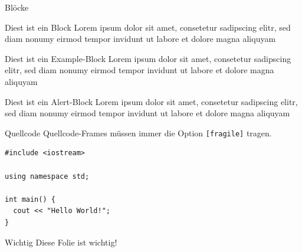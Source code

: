 \documentclass[fleqn,11pt]{beamer}
\begin{document}
\begin{frame}{Blöcke}
  \begin{block}{Diest ist ein Block}
    Lorem ipsum dolor sit amet, consetetur sadipscing elitr, sed diam
    nonumy eirmod tempor invidunt ut labore et dolore magna aliquyam
  \end{block}
  \begin{exampleblock}{Diest ist ein Example-Block}
    Lorem ipsum dolor sit amet, consetetur sadipscing elitr, sed diam
    nonumy eirmod tempor invidunt ut labore et dolore magna aliquyam
  \end{exampleblock}
  \begin{alertblock}{Diest ist ein Alert-Block}
    Lorem ipsum dolor sit amet, consetetur sadipscing elitr, sed diam
    nonumy eirmod tempor invidunt ut labore et dolore magna aliquyam
  \end{alertblock}
\end{frame}


\begin{frame}[fragile]{Quellcode}
Quellcode-Frames müssen immer die Option \texttt{[fragile]} tragen.
  \begin{verbatim}
#include <iostream>

using namespace std;

int main() {
  cout << "Hello World!";
}
  \end{verbatim}
\end{frame}



\begin{highlightframe}{Wichtig}
Diese Folie ist wichtig!
\end{highlightframe}
\end{document}
